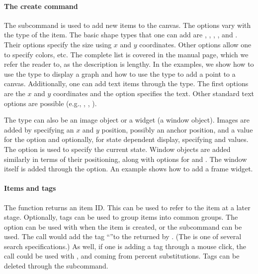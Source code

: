 \paragraph{The create command}
The subcommand  is used
to add new items to the canvas. The options vary with the type of the
item. The basic shape types that one can add are ,
, , , and
. Their options specify the size using $x$ and $y$
coordinates. Other options allow one to specify colors, etc. The
complete list is covered in the  manual page, which we
refer the reader to, as the description is lengthy.  In the examples,
we show how to use the  type to display a graph and how to
use the  type to add a point to a canvas. Additionally,
one can add text items through the  type. The first
options are the $x$ and $y$ coordinates and the  option
specifies the text.  Other standard text options are possible (e.g.,
, , ).

The type can also be an image object or a widget (a window object). Images are added by specifying an $x$ and $y$ position, possibly an anchor position, and a value for the  option and optionally, for state dependent display, specifying  and  values. The  option is used to specify the current state. Window objects are added similarly in terms of their positioning, along with options for  and . The window itself is added through the  option. An example shows how to add a frame widget.



\paragraph{Items and tags}
The  function returns an item ID. This can be
used to refer to the item at a later stage. Optionally, tags can be
used to group items into common groups. The  option can be
used with  when the item is created, or the
 subcommand can be used. The call
 would add the tag ``''to
the  returned by . (The  is
one of several search specifications.) As well, if one is
adding a tag through a mouse click, the call  could be used with , 
and  coming from percent substitutions. Tags can be deleted
through the  subcommand.

